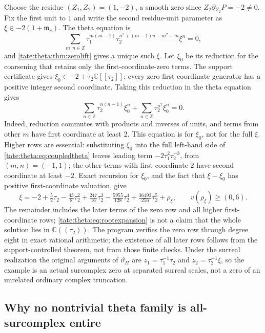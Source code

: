 \documentclass[11pt,letterpaper]{article}
\theoremstyle{definition}
\newcommand{\C}{\mathbb C}
\newcommand{\Z}{\mathbb Z}
\newcommand{\m}{\mathfrak m}
\begin{document}
Choose the residue $(Z_1,Z_2)=(1,-2)$, a smooth zero since
$Z_2\partial_{Z_2}P=-2\ne0$. Fix the first unit to $1$ and write the second
residue-unit parameter as $\xi\in-2(1+\m_v)$. The theta equation is
\begin{equation}
 \sum_{m,n\in\Z}\tau_1^{m(m-1)}\tau_2^{n^2+(m-1)n-m^2+m}\xi^n=0,
 \label{tate:theta:eq:coupledtheta}
\end{equation}
and \cref{tate:theta:thm:zerolift} gives a unique such $\xi$.
Let $\xi_0$ be its reduction for the coarsening that retains only the
first-coordinate-zero terms. The support certificate gives
$\xi_0\in-2+\tau_2\C[[\tau_2]]$: every zero-first-coordinate generator
has a positive integer second coordinate. Taking this reduction in the
theta equation gives
\begin{equation}
 \sum_{n\in\Z}\tau_2^{n(n-1)}\xi_0^n
   +\sum_{n\in\Z}\tau_2^{n^2}\xi_0^n=0.
 \label{tate:theta:eq:zerorow}
\end{equation}
Indeed, reduction commutes with products and inverses of units, and
terms from other $m$ have first coordinate at least $2$. This equation
is for $\xi_0$, not for the full $\xi$. Higher rows are essential:
substituting $\xi_0$ into the full left-hand side of
\eqref{tate:theta:eq:coupledtheta} leaves leading term
$-2\tau_1^2\tau_2^{-3}$, from $(m,n)=(-1,1)$; the other terms with
first coordinate $2$ have second coordinate at least $-2$.
Exact recursion for $\xi_0$, and the fact that $\xi-\xi_0$ has positive
first-coordinate valuation, give
\begin{equation}
 \xi=-2+\tfrac52\tau_2-\tfrac{43}{8}\tau_2^2+\tfrac{247}{16}\tau_2^3
     -\tfrac{5955}{128}\tau_2^4+\tfrac{36493}{256}\tau_2^5+\rho_\xi,
 \qquad v(\rho_\xi)\ge(0,6).\label{tate:theta:eq:rootexpansion}
\end{equation}
The remainder includes the later terms of the zero row and all higher
first-coordinate rows; \eqref{tate:theta:eq:rootexpansion} is not a claim
that the whole solution lies in $\C((\tau_2))$. The program verifies the
zero row through degree eight in exact rational arithmetic; the existence of
all later rows follows from the support-controlled theorem, not from those
finite checks. Under the surreal realization the original arguments of
$\vartheta_\Pi$ are $z_1=\tau_1^{-1}\tau_2$ and $z_2=\tau_2^{-1}\xi$, so the
example is an actual surcomplex zero at separated surreal scales, not a
zero of an unrelated ordinary complex truncation.

\subsection{Why no nontrivial theta family is all-surcomplex entire}
\end{document}
